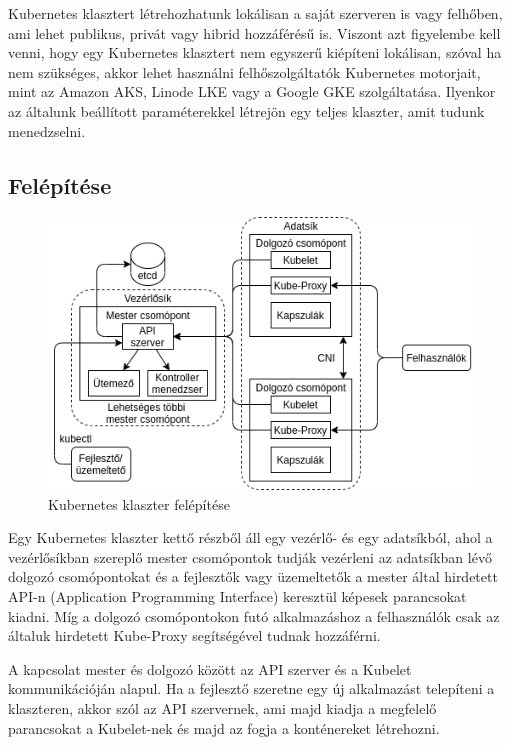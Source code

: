 Kubernetes klasztert létrehozhatunk lokálisan a saját szerveren is vagy felhőben,
ami lehet publikus, privát vagy hibrid hozzáférésű is. Viszont azt figyelembe 
kell venni, hogy egy Kubernetes klasztert nem egyszerű kiépíteni lokálisan, 
szóval ha nem szükséges, akkor lehet használni felhőszolgáltatók Kubernetes 
motorjait, mint az Amazon AKS, Linode LKE vagy a Google GKE szolgáltatása.
Ilyenkor az általunk beállított paraméterekkel létrejön egy teljes klaszter, amit
tudunk menedzselni.

\subsection{Felépítése}

\begin{figure}[!ht]
	\centering
	\includegraphics[width=1\textwidth, keepaspectratio]{figures/k8s_architecture.png}
	\caption{Kubernetes klaszter felépítése}
	\label{fig:achitecture}
\end{figure}

Egy Kubernetes klaszter kettő részből áll egy vezérlő- és egy adatsíkból, ahol a 
vezérlősíkban szereplő mester csomópontok tudják vezérleni az adatsíkban 
lévő dolgozó csomópontokat és a fejlesztők vagy üzemeltetők a mester által
hirdetett API-n (Application Programming Interface) keresztül képesek parancsokat
kiadni. Míg a dolgozó csomópontokon futó alkalmazáshoz a felhasználók csak az 
általuk hirdetett Kube-Proxy segítségével tudnak hozzáférni. 

A kapcsolat mester és dolgozó között az API szerver és a Kubelet kommunikációján
alapul. Ha a fejlesztő szeretne egy új alkalmazást telepíteni a klaszteren, akkor
szól az API szervernek, ami majd kiadja a megfelelő parancsokat a Kubelet-nek 
és majd az fogja a konténereket létrehozni.

